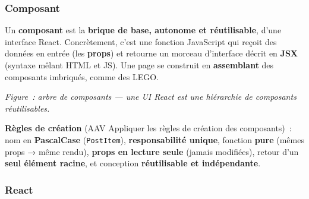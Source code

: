 \subsubsection*{Composant}
{}

\noindent Un \textbf{composant} est la \textbf{brique de base, autonome et réutilisable}, d'une interface React. Concrètement, c'est une fonction JavaScript qui reçoit des données en entrée (les \textbf{props}) et retourne un morceau d'interface décrit en \textbf{JSX} (syntaxe mêlant HTML et JS). Une page se construit en \textbf{assemblant} des composants imbriqués, comme des LEGO.
\vspace{0.5cm}
\begin{center}
\end{center}
\vspace{0.5cm}
\noindent\textit{Figure~: arbre de composants — une UI React est une hiérarchie de composants réutilisables.}

\noindent \textbf{Règles de création} (AAV \og{}Appliquer les règles de création des composants\fg{})~: nom en \textbf{PascalCase} (\texttt{PostItem}), \textbf{responsabilité unique}, fonction \textbf{pure} (mêmes props → même rendu), \textbf{props en lecture seule} (jamais modifiées), retour d'un \textbf{seul élément racine}, et conception \textbf{réutilisable et indépendante}.

\newpage

\subsubsection*{React}
{}

